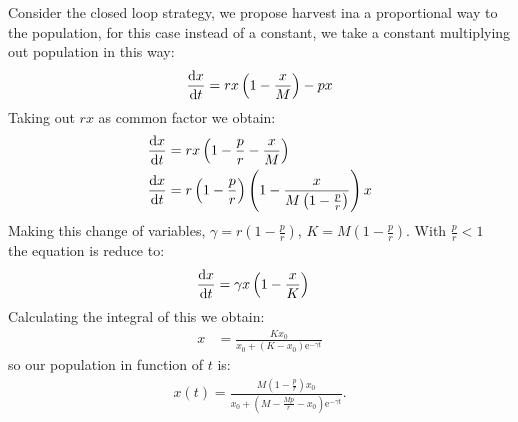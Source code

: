 Consider the closed loop strategy, we propose harvest ina a proportional way to the population, for this case instead of a constant, we take a constant multiplying out population in this way:
\begin{equation}
\frac{\mathrm{d} x}{{\mathrm{d} t}}=rx\left(1-\frac{x}{M}\right)-px \label{eq: PropHarvest}
\end{equation}
Taking out $rx$ as common factor we obtain:
\begin{align}
\frac{\mathrm{d} x}{{\mathrm{d} t}}&=rx\left(1-\frac{p}{r}-\frac{x}{M}\right) \\
\frac{\mathrm{d} x}{{\mathrm{d} t}}&=r\left(1-\frac{p}{r}\right)\left(1-\frac{x}{M\left(1-\frac{p}{r}\right)}\right)x
\end{align}
Making this change of variables,
$\gamma=r\left(1-\frac{p}{r}\right)$, $K=M\left(1-\frac{p}{r}\right)$. With $\frac{p}{r}<1$\\
the equation is reduce to:
\begin{align}
\frac{\mathrm{d} x}{{\mathrm{d} t}}&=\gamma x\left(1-\frac{x}{K}\right)
\end{align}
Calculating the integral of this we obtain:
\begin{align}
x&=\frac{Kx_0}{x_0+\left(K-x_0\right)\mathrm{e}^{-\gamma t}}
\end{align}
so our population in function of $t$ is:
\begin{align}
x(t)=\frac{M\left(1-\frac{p}{r}\right)x_0}{x_0+\left(M-\frac{Mp}{r}-x_0\right)\mathrm{e}^{-\gamma t}}. \label{eq: Proportional Population}
\end{align}